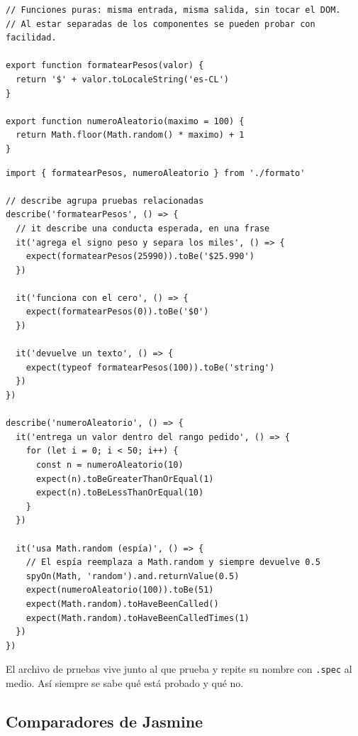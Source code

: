 \documentclass[11pt,a4paper]{article}
\newcommand{\cmd}[1]{\texttt{\color{reactdark}#1}}
\begin{document}
\begin{lstlisting}[language=JSX,title={\small\ttfamily src/logica/formato.js}]
// Funciones puras: misma entrada, misma salida, sin tocar el DOM.
// Al estar separadas de los componentes se pueden probar con facilidad.

export function formatearPesos(valor) {
  return '$' + valor.toLocaleString('es-CL')
}

export function numeroAleatorio(maximo = 100) {
  return Math.floor(Math.random() * maximo) + 1
}
\end{lstlisting}
\begin{lstlisting}[language=JSX,title={\small\ttfamily src/logica/formato.spec.js}]
import { formatearPesos, numeroAleatorio } from './formato'

// describe agrupa pruebas relacionadas
describe('formatearPesos', () => {
  // it describe una conducta esperada, en una frase
  it('agrega el signo peso y separa los miles', () => {
    expect(formatearPesos(25990)).toBe('$25.990')
  })

  it('funciona con el cero', () => {
    expect(formatearPesos(0)).toBe('$0')
  })

  it('devuelve un texto', () => {
    expect(typeof formatearPesos(100)).toBe('string')
  })
})

describe('numeroAleatorio', () => {
  it('entrega un valor dentro del rango pedido', () => {
    for (let i = 0; i < 50; i++) {
      const n = numeroAleatorio(10)
      expect(n).toBeGreaterThanOrEqual(1)
      expect(n).toBeLessThanOrEqual(10)
    }
  })

  it('usa Math.random (espía)', () => {
    // El espía reemplaza a Math.random y siempre devuelve 0.5
    spyOn(Math, 'random').and.returnValue(0.5)
    expect(numeroAleatorio(100)).toBe(51)
    expect(Math.random).toHaveBeenCalled()
    expect(Math.random).toHaveBeenCalledTimes(1)
  })
})
\end{lstlisting}

El archivo de pruebas vive junto al que prueba y repite su nombre con \cmd{.spec} al medio. Así siempre se sabe qué está probado y qué no.

\subsection{Comparadores de Jasmine}
\end{document}

